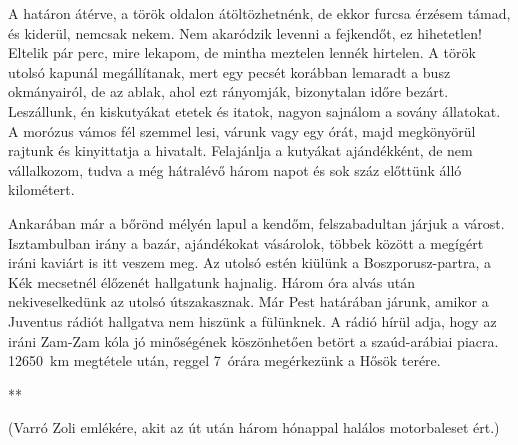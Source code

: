 A határon átérve, a török oldalon átöltözhetnénk, de ekkor furcsa
érzésem támad, és kiderül, nemcsak nekem. Nem akaródzik levenni a
fejkendőt, ez hihetetlen! Eltelik pár perc, mire lekapom, de mintha
meztelen lennék hirtelen. A török utolsó kapunál megállítanak, mert egy
pecsét korábban lemaradt a busz okmányairól, de az ablak, ahol ezt
rányomják, bizonytalan időre bezárt. Leszállunk, én kiskutyákat etetek és
itatok, nagyon sajnálom a sovány állatokat. A morózus vámos fél szemmel
lesi, várunk vagy egy órát, majd megkönyörül rajtunk és kinyittatja
a hivatalt. Felajánlja a kutyákat ajándékként, de nem vállalkozom, tudva
a még hátralévő három napot és sok száz előttünk álló kilométert.

Ankarában már a bőrönd mélyén lapul a kendőm, felszabadultan
járjuk a várost. Isztambulban irány a bazár, ajándékokat vásárolok,
többek között a megígért iráni kaviárt is itt veszem meg. Az utolsó estén
kiülünk a Boszporusz-partra, a Kék mecsetnél élőzenét hallgatunk hajnalig.
Három óra alvás után nekiveselkedünk az utolsó útszakasznak.
Már Pest határában járunk, amikor a Juventus rádiót hallgatva nem
hiszünk a fülünknek. A rádió hírül adja, hogy az iráni Zam-Zam kóla
jó minőségének köszönhetően betört a szaúd-arábiai piacra. 12650~km
megtétele után, reggel 7~órára megérkezünk a Hősök terére.

{\centering ***\par}

(Varró Zoli emlékére, akit az út után három hónappal halálos motorbaleset
ért.)
